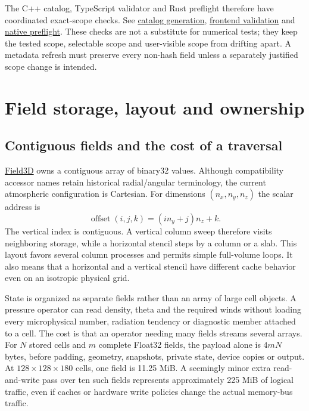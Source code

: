 The C++ catalog, TypeScript validator and Rust preflight therefore have
coordinated exact-scope checks. See
\href{../src/core/runtime/scheme_catalog.cpp}{catalog generation},
\href{../ui/src/lib/config/schemeCatalog.ts}{frontend validation} and
\href{../ui/src-tauri/src/commands/config_preflight.rs}{native preflight}.
These checks are not a substitute for numerical tests; they keep the tested
scope, selectable scope and user-visible scope from drifting apart. A metadata
refresh must preserve every non-hash field unless a separately justified scope
change is intended.

\section{Field storage, layout and ownership}
\label{architecture-storage}

\subsection{Contiguous fields and the cost of a traversal}

\href{../include/core/field/field3d.hpp}{Field3D} owns a contiguous array of
binary32 values. Although compatibility accessor names retain historical
radial/angular terminology, the current atmospheric configuration is Cartesian.
For dimensions $(n_x,n_y,n_z)$ the scalar address is
\[
  \operatorname{offset}(i,j,k)=(i n_y+j)n_z+k.
\]
The vertical index is contiguous. A vertical column sweep therefore visits
neighboring storage, while a horizontal stencil steps by a column or a slab.
This layout favors several column processes and permits simple full-volume
loops. It also means that a horizontal and a vertical stencil have different
cache behavior even on an isotropic physical grid.

State is organized as separate fields rather than an array of large cell
objects. A pressure operator can read density, theta and the required winds
without loading every microphysical number, radiation tendency or diagnostic
member attached to a cell. The cost is that an operator needing many fields
streams several arrays. For $N$ stored cells and $m$ complete Float32 fields,
the payload alone is $4mN$ bytes, before padding, geometry, snapshots, private
state, device copies or output. At $128\times128\times180$ cells, one field is
11.25 MiB. A seemingly minor extra read-and-write pass over ten such fields
represents approximately 225 MiB of logical traffic, even if caches or hardware
write policies change the actual memory-bus traffic.

